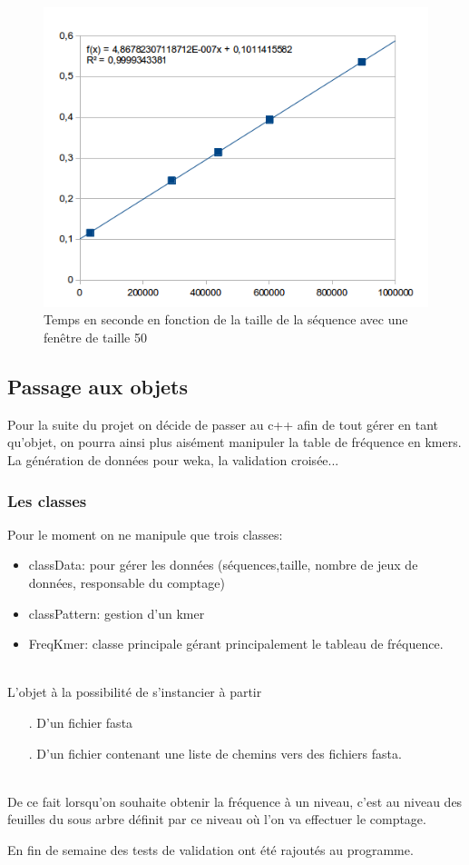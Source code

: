 \begin{figure}[H]
\begin{center}
\includegraphics[scale=0.6]{./../img/graphe_taille.png}
\caption[Temps de du comptage]{\label{taille_cpt}Temps en seconde en fonction de la taille de la séquence avec une fenêtre de taille 50}
\end{center}
\end{figure}
  
\subsection{Passage aux objets}
Pour la suite du projet on décide de passer au c++ afin de tout gérer en tant qu'objet, on pourra ainsi plus aisément manipuler la table de fréquence en kmers. La génération
de données pour weka, la validation croisée...
\subsubsection{Les classes}
Pour le moment on ne manipule que trois classes:
\begin{itemize}
 \item classData: pour gérer les données (séquences,taille, nombre de jeux de données, responsable du comptage)
  \item classPattern: gestion d'un kmer
  \item FreqKmer: classe principale gérant principalement le tableau de fréquence.
\end{itemize}
~\\

L'objet à la possibilité de s'instancier à partir 
\begin{itemize}
 \item[.] D'un fichier fasta
 \item[.] D'un fichier contenant une liste de chemins vers des fichiers fasta.
\end{itemize}
~\\

De ce fait lorsqu'on souhaite obtenir la fréquence à un niveau, c'est au niveau des feuilles du sous arbre définit par ce niveau où l'on va effectuer le comptage.

En fin de semaine des tests de validation ont été rajoutés au programme. 
